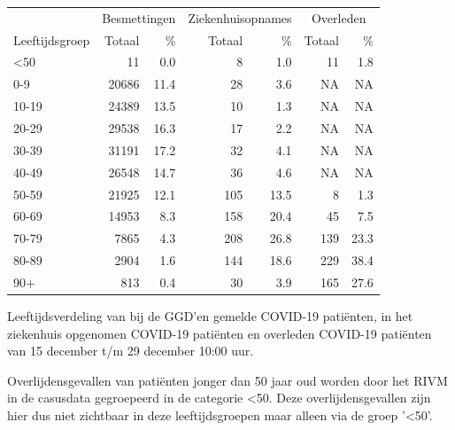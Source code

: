 \documentclass[
  english,
  man,floatsintext]{apa6}
\begin{document}
\begin{table}
\centering\begingroup\fontsize{11}{13}\selectfont

\begin{threeparttable}
\begin{tabular}{lrrrrrr}
\toprule
\multicolumn{1}{c}{ } & \multicolumn{2}{c}{Besmettingen} & \multicolumn{2}{c}{Ziekenhuisopnames} & \multicolumn{2}{c}{Overleden} \\
\cmidrule(l{3pt}r{3pt}){2-3} \cmidrule(l{3pt}r{3pt}){4-5} \cmidrule(l{3pt}r{3pt}){6-7}
Leeftijdsgroep & Totaal & \% & Totaal & \% & Totaal & \%\\
\midrule
<50 & 11 & 0.0 & 8 & 1.0 & 11 & 1.8\\
0-9 & 20686 & 11.4 & 28 & 3.6 & NA & NA\\
10-19 & 24389 & 13.5 & 10 & 1.3 & NA & NA\\
20-29 & 29538 & 16.3 & 17 & 2.2 & NA & NA\\
30-39 & 31191 & 17.2 & 32 & 4.1 & NA & NA\\
40-49 & 26548 & 14.7 & 36 & 4.6 & NA & NA\\
50-59 & 21925 & 12.1 & 105 & 13.5 & 8 & 1.3\\
60-69 & 14953 & 8.3 & 158 & 20.4 & 45 & 7.5\\
70-79 & 7865 & 4.3 & 208 & 26.8 & 139 & 23.3\\
80-89 & 2904 & 1.6 & 144 & 18.6 & 229 & 38.4\\
90+ & 813 & 0.4 & 30 & 3.9 & 165 & 27.6\\
\bottomrule
\end{tabular}
\begin{tablenotes}
\item[1] Leeftijdsverdeling van bij de GGD’en gemelde COVID-19 patiënten, in het ziekenhuis opgenomen COVID-19 patiënten en overleden COVID-19 patiënten van 15 december t/m 29 december 10:00 uur.
\item[2] Overlijdensgevallen van patiënten jonger dan 50 jaar oud worden door het RIVM in de casusdata gegroepeerd in de categorie <50. Deze overlijdensgevallen zijn hier dus niet zichtbaar in deze leeftijdsgroepen maar alleen via de groep '<50'.
\end{tablenotes}
\end{threeparttable}
\endgroup{}
\end{table}

\newpage
\end{document}
